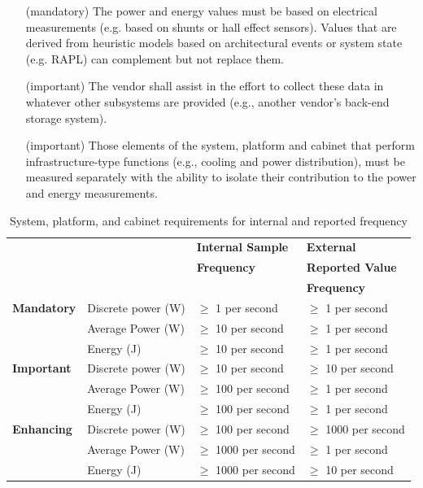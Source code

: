 \begin{itemize}
\item[(mandatory)]
The power and energy values must be based on electrical measurements (e.g. based on shunts or hall effect sensors). Values that are derived from heuristic models based on architectural events or system state (e.g. RAPL) can complement but not replace them.

\item[(important)]
The vendor shall assist in the effort to collect these data in whatever other subsystems are provided (e.g., another vendor’s back-end storage system). 

\item[(important)]
Those elements of the system, platform and cabinet that perform infrastructure-type functions (e.g., cooling and power distribution), must be measured separately with the ability to isolate their contribution to the power and energy measurements.  

\end{itemize}


\begin{table}
\caption{System, platform, and cabinet requirements for internal and reported frequency}
\label{tab:spclevel}
\begin{tabular}{|p{3.0cm}|p{3.5cm}|p{3.5cm}|p{3.5cm}|} \hline
& & \textbf{Internal Sample}&\textbf{External}\\ 
& & \textbf{Frequency}&\textbf{Reported Value}\\ 
& & & \textbf{Frequency}\\ \hline

\textbf{Mandatory} &
Discrete power (W)&
\mbox{$ \ge $} 1 per second &
\mbox{$ \ge $} 1 per second \\

& 
Average Power (W) &
\mbox{$ \ge $} 10 per second &
\mbox{$ \ge $} 1 per second \\

& 
Energy (J) &
\mbox{$ \ge $} 10 per second &
\mbox{$ \ge $} 1 per second \\ \hline

\textbf{Important} & 
Discrete power (W)&
\mbox{$ \ge $} 10 per second &
\mbox{$ \ge $} 10 per second \\

& 
Average Power (W) &
\mbox{$ \ge $} 100 per second &
\mbox{$ \ge $} 1 per second \\

& 
Energy (J) &
\mbox{$ \ge $} 100 per second &
\mbox{$ \ge $} 1 per second \\ \hline 

\textbf{Enhancing} & 
Discrete power (W)&
\mbox{$ \ge $} 100 per second &
\mbox{$ \ge $} 1000 per second \\

& 
Average Power (W) &
\mbox{$ \ge $} 1000 per second &
\mbox{$ \ge $} 1 per second \\

& 
Energy (J) &
\mbox{$ \ge $} 1000 per second &
\mbox{$ \ge $} 10 per second \\ \hline

\end{tabular}
\end{table}


